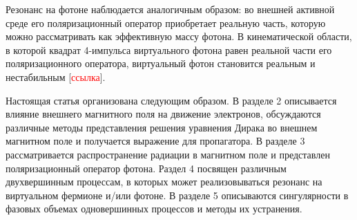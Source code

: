 Резонанс на фотоне наблюдается аналогичным образом: во внешней активной среде его поляризационный оператор приобретает реальную часть, которую можно рассматривать как эффективную массу фотона. В кинематической 
области, в которой квадрат 4-импульса виртуального фотона равен реальной части его поляризационного оператора, виртуальный фотон становится реальным и нестабильным [\textcolor{red}{ссылка}].

Настоящая статья организована следующим образом. В разделе 2 описывается влияние внешнего магнитного поля на движение электронов, обсуждаются различные методы представления решения уравнения Дирака во внешнем магнитном поле и получается выражение для пропагатора. В разделе 3 рассматривается распространение радиации в магнитном поле и представлен поляризационный оператор фотона. Раздел 4 посвящен различным двухвершинным процессам, в которых может 
реализовываться резонанс на виртуальном фермионе и/или фотоне. В разделе 5 описываются сингулярности в фазовых объемах одновершинных процессов и методы их устранения.